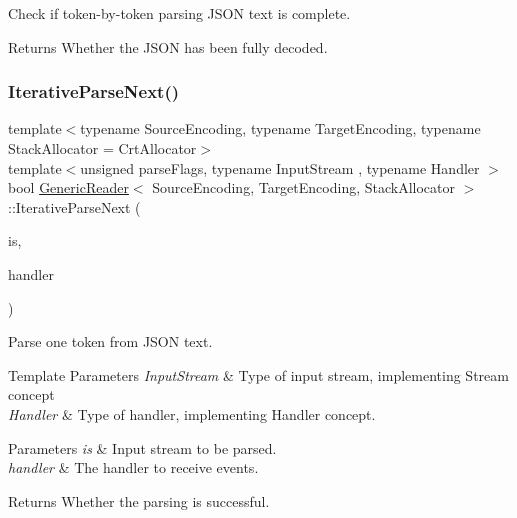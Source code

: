 Check if token-\/by-\/token parsing J\+S\+ON text is complete. 

\begin{DoxyReturn}{Returns}
Whether the J\+S\+ON has been fully decoded. 
\end{DoxyReturn}
\mbox{\label{a02220_a257891331e0c259903e7066fb4cebf92}} 
\subsubsection{\texorpdfstring{Iterative\+Parse\+Next()}{IterativeParseNext()}}
{\footnotesize\ttfamily template$<$typename Source\+Encoding, typename Target\+Encoding, typename Stack\+Allocator = Crt\+Allocator$>$ \\
template$<$unsigned parse\+Flags, typename Input\+Stream , typename Handler $>$ \\
bool \hyperlink{a02220}{Generic\+Reader}$<$ Source\+Encoding, Target\+Encoding, Stack\+Allocator $>$\+::Iterative\+Parse\+Next (\begin{DoxyParamCaption}\item[{Input\+Stream \&}]{is,  }\item[{Handler \&}]{handler }\end{DoxyParamCaption})\hspace{0.3cm}{\ttfamily [inline]}}



Parse one token from J\+S\+ON text. 


\begin{DoxyTemplParams}{Template Parameters}
{\em Input\+Stream} & Type of input stream, implementing Stream concept \\
\hline
{\em Handler} & Type of handler, implementing Handler concept. \\
\hline
\end{DoxyTemplParams}

\begin{DoxyParams}{Parameters}
{\em is} & Input stream to be parsed. \\
\hline
{\em handler} & The handler to receive events. \\
\hline
\end{DoxyParams}
\begin{DoxyReturn}{Returns}
Whether the parsing is successful. 
\end{DoxyReturn}
\mbox{\label{a02220_a0c450620d14ff1824e58bb7bd9b42099}} 
